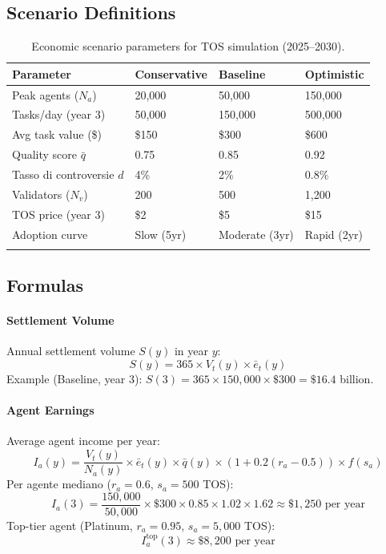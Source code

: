 \documentclass[11pt]{article}
\begin{document}
\begin{itemize}[noitemsep]
\subsection{Scenario Definitions}
\begin{longtable}{@{}p{}p{}p{}p{}@{}}
\toprule
\textbf{Parameter} & \textbf{Conservative} & \textbf{Baseline} & \textbf{Optimistic} \\\midrule
Peak agents ($N_a$) & 20,000 & 50,000 & 150,000 \\
Tasks/day (year 3) & 50,000 & 150,000 & 500,000 \\
Avg task value (\$) & \$150 & \$300 & \$600 \\
Quality score $\bar{q}$ & 0.75 & 0.85 & 0.92 \\
Tasso di controversie $d$ & 4\% & 2\% & 0.8\% \\
Validators ($N_v$) & 200 & 500 & 1,200 \\
TOS price (year 3) & \$2 & \$5 & \$15 \\
Adoption curve & Slow (5yr) & Moderate (3yr) & Rapid (2yr) \\\bottomrule
\caption{Economic scenario parameters for TOS simulation (2025--2030).}
\label{tab:econ-scenarios}
\end{longtable}

\subsection{Formulas}
\paragraph{Settlement Volume} Annual settlement volume $S(y)$ in year $y$:
\begin{equation}
S(y) = 365 \times V_t(y) \times \bar{e}_t(y)
\end{equation}
Example (Baseline, year 3): $S(3) = 365 \times 150{,}000 \times \$300 = \$16.4$ billion.

\paragraph{Agent Earnings} Average agent income per year:
\begin{equation}
I_a(y) = \frac{V_t(y)}{N_a(y)} \times \bar{e}_t(y) \times \bar{q}(y) \times (1 + 0.2(r_a - 0.5)) \times f(s_a)
\end{equation}
Per agente mediano ($r_a = 0.6$, $s_a = 500$ TOS):
\begin{equation}
I_a(3) = \frac{150{,}000}{50{,}000} \times \$300 \times 0.85 \times 1.02 \times 1.62 \approx \$1{,}250 \text{ per year}
\end{equation}
Top-tier agent (Platinum, $r_a = 0.95$, $s_a = 5{,}000$ TOS):
\begin{equation}
I_a^{\text{top}}(3) \approx \$8{,}200 \text{ per year}
\end{equation}


\end{itemize}
\end{document}
